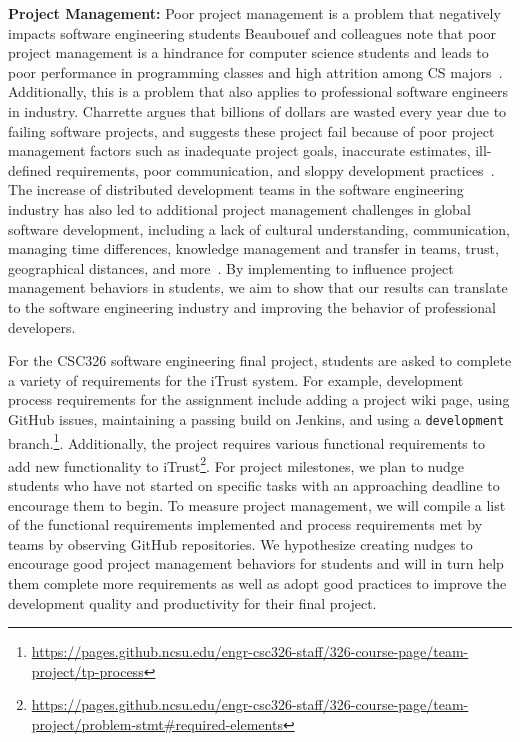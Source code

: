 \textbf{Project Management:} Poor project management is a problem that negatively impacts software engineering students Beaubouef and colleagues note that poor project management is a hindrance for computer science students and leads to poor performance in programming classes and high attrition among CS majors~\cite{beaubouef2005high}. Additionally, this is a problem that also applies to professional software engineers in industry. Charrette argues that billions of dollars are wasted every year due to failing software projects, and suggests these project fail because of poor project management factors such as inadequate project goals, inaccurate estimates, ill-defined requirements, poor communication, and sloppy development practices~\cite{charette2005software}. The increase of distributed development teams in the software engineering industry has also led to additional project management challenges in global software development, including a lack of cultural understanding, communication, managing time differences, knowledge management and transfer in teams, trust, geographical distances, and more~\cite{niazi2016challenges}. By implementing \TOOL to influence project management behaviors in students, we aim to show that our results can translate to the software engineering industry and improving the behavior of professional developers.

For the CSC326 software engineering final project, students are asked to complete a variety of requirements for the iTrust system. For example, development process requirements for the assignment include adding a project wiki page, using GitHub issues, maintaining a passing build on Jenkins, and using a \texttt{development} branch.\footnote{\url{https://pages.github.ncsu.edu/engr-csc326-staff/326-course-page/team-project/tp-process}}. Additionally, the project requires various functional requirements to add new functionality to iTrust\footnote{\url{https://pages.github.ncsu.edu/engr-csc326-staff/326-course-page/team-project/problem-stmt#required-elements}}. For project milestones, we plan to nudge students who have not started on specific tasks with an approaching deadline to encourage them to begin. To measure project management, we will compile a list of the functional requirements implemented and process requirements met by teams by observing GitHub repositories. We hypothesize creating nudges to encourage good project management behaviors for students and will in turn help them complete more requirements as well as adopt good practices to improve the development quality and productivity for their final project.

